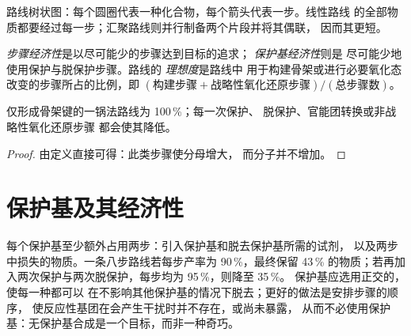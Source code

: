\begin{omfigure}

{\small 路线树状图：每个圆圈代表一种化合物，每个箭头代表一步。线性路线
的全部物质都要经过每一步；汇聚路线则并行制备两个片段并将其偶联，
因而其更短。}
\end{omfigure}

\begin{definition}[经济性与理想度]\label{def:b3:total-synthesis:economy}
\emph{步骤经济性}是以尽可能少的步骤达到目标的追求；
\emph{保护基经济性}则是
尽可能少地使用保护与脱保护步骤。路线的
\emph{理想度}是路线中
用于构建骨架或进行必要氧化态改变的步骤所占的比例，即
$(\text{构建步骤} + \text{战略性氧化还原步骤})/(\text{总步骤数})$。
\end{definition}

\begin{proposition}[路线的理想度]\label{prop:b3:total-synthesis:ideality}
仅形成骨架键的一锅法路线为 100\,\%；每一次保护、
脱保护、官能团转换或非战略性氧化还原步骤
都会使其降低。
\end{proposition}

\begin{proof}
由定义直接可得：此类步骤使分母增大，
而分子并不增加。
\end{proof}

\section{保护基及其经济性}

每个保护基至少额外占用两步：引入保护基和脱去保护基所需的试剂，
以及两步中损失的物质。一条八步路线若每步产率为 90\,\%，最终保留
43\,\% 的物质；若再加入两次保护与两次脱保护，每步均为 95\,\%，则降至 35\,\%。
保护基应选用正交的，使每一种都可以
在不影响其他保护基的情况下脱去；更好的做法是安排步骤的顺序，
使反应性基团在会产生干扰时并不存在，或尚未暴露，
从而不必使用保护基：无保护基合成是一个目标，而非一种奇巧。

